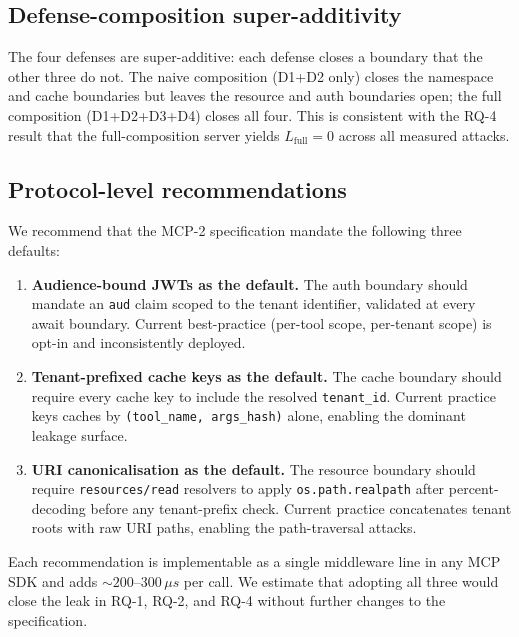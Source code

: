 \documentclass[sigconf, anonymous, natbib=false]{acmart}
\begin{document}
\subsection{Defense-composition super-additivity}

The four defenses are super-additive: each defense closes
a boundary that the other three do not. The naive
composition (D1+D2 only) closes the namespace and cache
boundaries but leaves the resource and auth boundaries
open; the full composition (D1+D2+D3+D4) closes all four.
This is consistent with the RQ-4 result that the
full-composition server yields $L_{\text{full}} = 0$
across all measured attacks.

\subsection{Protocol-level recommendations}

We recommend that the MCP-2 specification mandate the
following three defaults:

\begin{enumerate}
  \item \textbf{Audience-bound JWTs as the default.} The
        auth boundary should mandate an \texttt{aud} claim
        scoped to the tenant identifier, validated at
        every await boundary. Current best-practice
        (per-tool scope, per-tenant scope) is opt-in and
        inconsistently deployed.
  \item \textbf{Tenant-prefixed cache keys as the
        default.} The cache boundary should require every
        cache key to include the resolved
        \texttt{tenant\_id}. Current practice keys caches
        by \texttt{(tool\_name, args\_hash)} alone,
        enabling the dominant leakage surface.
  \item \textbf{URI canonicalisation as the default.} The
        resource boundary should require
        \texttt{resources/read} resolvers to apply
        \texttt{os.path.realpath} after percent-decoding
        before any tenant-prefix check. Current practice
        concatenates tenant roots with raw URI paths,
        enabling the path-traversal attacks.
\end{enumerate}

Each recommendation is implementable as a single
middleware line in any MCP SDK and adds $\sim 200$--$300
\,\mu s$ per call. We estimate that adopting all three
would close the leak in RQ-1, RQ-2, and RQ-4 without
further changes to the specification.
\end{document}
